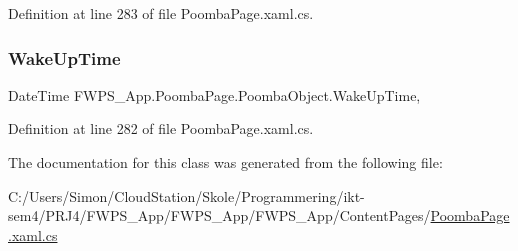 Definition at line 283 of file Poomba\+Page.\+xaml.\+cs.

\mbox{\label{class_f_w_p_s___app_1_1_poomba_page_1_1_poomba_object_acac9138a239e0d59e57e01be46d7ea3b}} 
\subsubsection{\texorpdfstring{Wake\+Up\+Time}{WakeUpTime}}
{\footnotesize\ttfamily Date\+Time F\+W\+P\+S\+\_\+\+App.\+Poomba\+Page.\+Poomba\+Object.\+Wake\+Up\+Time\hspace{0.3cm}{\ttfamily [get]}, {\ttfamily [set]}}



Definition at line 282 of file Poomba\+Page.\+xaml.\+cs.



The documentation for this class was generated from the following file\+:\begin{DoxyCompactItemize}
\item 
C\+:/\+Users/\+Simon/\+Cloud\+Station/\+Skole/\+Programmering/ikt-\/sem4/\+P\+R\+J4/\+F\+W\+P\+S\+\_\+\+App/\+F\+W\+P\+S\+\_\+\+App/\+F\+W\+P\+S\+\_\+\+App/\+Content\+Pages/\mbox{\hyperlink{_poomba_page_8xaml_8cs}{Poomba\+Page.\+xaml.\+cs}}\end{DoxyCompactItemize}
